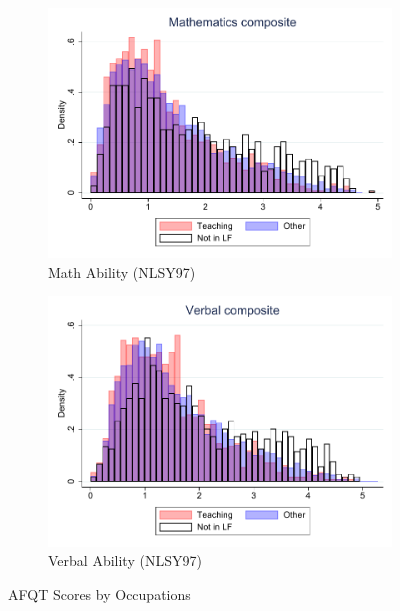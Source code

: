 \documentclass[onehalfspacing,11pt]{article}
\begin{document}
\begin{figure}
\begin{subfigure}{0.49\textwidth}
		\includegraphics[width=\linewidth]{NLSY97_Mathematics_occ.pdf}
		\caption{Math Ability (NLSY97)} \label{fig:nlsy97math}
	\end{subfigure}
	\hspace*{\fill} %
	\begin{subfigure}{0.49\textwidth}
		\includegraphics[width=\linewidth]{NLSY97_Verbal_occ.pdf}
		\caption{Verbal Ability (NLSY97)} \label{fig:nlsy97wprd}
	\end{subfigure}

	\caption{AFQT Scores by Occupations}
	\label{fig:nlsy_by_occ}
\end{figure}

\end{document}
